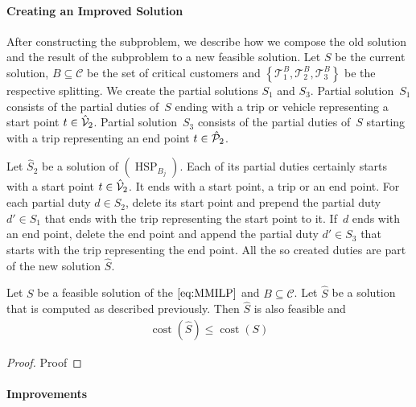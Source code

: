 \paragraph{Creating an Improved Solution} \parfill

After constructing the subproblem, we describe how we compose the old solution and the result of the subproblem to a new feasible solution. Let $S$ be the current solution, $B\subseteq\mathcal{C}$ be the set of critical customers and $\left\{\mathcal{T}^B_1,\mathcal{T}^B_2,\mathcal{T}^B_3\right\}$ be the respective splitting. We create the partial solutions $S_1$ and $S_3$. Partial solution~$S_1$ consists of the partial duties of~$S$ ending with a trip or vehicle representing a start point ${t\in\hat{\mathcal{V}}_2}$. Partial solution~$S_3$ consists of the partial duties of~$S$ starting with a trip representing an end point ${t\in\hat{\mathcal{P}}_2}$. 

Let $\widehat{S}_2$ be a solution of $(\operatorname{HSP}_{B_j})$. Each of its partial duties certainly starts with a start point ${t\in\hat{\mathcal{V}}_2}$. It ends with a start point, a trip or an end point. For each partial duty ${d\in\widehat{S}_2}$, delete its start point and prepend the partial duty ${d'\in S_1}$ that ends with the trip representing the start point to it. If~$d$ ends with an end point, delete the end point and append the partial duty ${d'\in S_3}$ that starts with the trip representing the end point. All the so created duties are part of the new solution $\widehat{S}$.

\begin{lemma}
\label{lem:feasibility_hsp}

Let $S$ be a feasible solution of the $\eqref{eq:MMILP}$ and $B\subseteq\mathcal{C}$. Let $\widehat{S}$ be a solution that is computed as described previously. Then $\widehat{S}$ is also feasible and
\begin{align*}
	\operatorname{cost}\left(\widehat{S}\right) \leq \operatorname{cost}\left(S\right)
\end{align*}

\end{lemma}

\begin{proof}

Proof

\end{proof}

\paragraph{Improvements} \parfill

